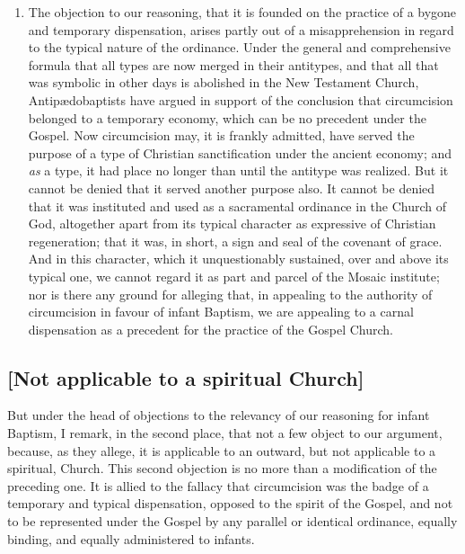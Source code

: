 \documentclass[
]{book}
\providecommand{\tightlist}{%
  \setlength{\itemsep}{0pt}\setlength{\parskip}{0pt}}
\begin{document}
\begin{enumerate}
\end{enumerate}

\begin{enumerate}
\def\labelenumi{\arabic{enumi}.}
\setcounter{enumi}{1}
\tightlist
\item
  The objection to our reasoning, that it is founded on the practice of a bygone and temporary dispensation, arises partly out of a misapprehension in regard to the typical nature of the ordinance. Under the general and comprehensive formula that all types are now merged in their antitypes, and that all that was symbolic in other days is abolished in the New Testament Church, Antipædobaptists have argued in support of the conclusion that circumcision belonged to a temporary economy, which can be no precedent under the Gospel. Now circumcision may, it is frankly admitted, have served the purpose of a type of Christian sanctification under the ancient economy; and \emph{as} a type, it had place no longer than until the antitype was realized. But it cannot be denied that it served another purpose also. It cannot be denied that it was instituted and used as a sacramental ordinance in the Church of God, altogether apart from its typical character as expressive of Christian regeneration; that it was, in short, a sign and seal of the covenant of grace. And in this character, which it unquestionably sustained, over and above its typical one, we cannot regard it as part and parcel of the Mosaic institute; nor is there any ground for alleging that, in appealing to the authority of circumcision in favour of infant Baptism, we are appealing to a carnal dispensation as a precedent for the practice of the Gospel Church.
\end{enumerate}

\hypertarget{not-applicable-to-a-spiritual-church}{%
\subsection{{[}Not applicable to a spiritual Church{]}}\label{not-applicable-to-a-spiritual-church}}

But under the head of objections to the relevancy of our reasoning for infant Baptism, I remark, in the second place, that not a few object to our argument, because, as they allege, it is applicable to an outward, but not applicable to a spiritual, Church. This second objection is no more than a modification of the preceding one. It is allied to the fallacy that circumcision was the badge of a temporary and typical dispensation, opposed to the spirit of the Gospel, and not to be represented under the Gospel by any parallel or identical ordinance, equally binding, and equally administered to infants.
\end{document}
